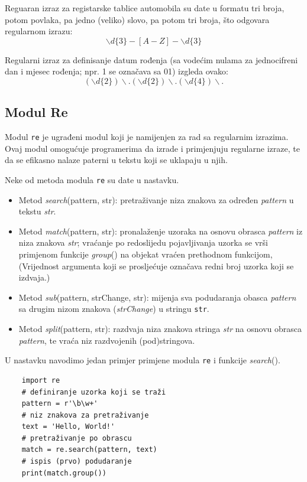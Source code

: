 Reguaran izraz za registarske tablice automobila su date u formatu tri broja, potom povlaka, pa jedno (veliko) slovo, pa potom tri broja, što odgovara regularnom izrazu:
$$ \backslash d \{3\}-[A-Z]-\backslash d\{3\}$$

Regularni izraz za definisanje datum rođenja (sa vodećim nulama za jednocifreni dan i mjesec rođenja; npr. 1 se označava sa 01) izgleda ovako:
$$(\backslash d \{2\})\backslash.(\backslash d \{2\})\backslash.(\backslash d \{4\})\backslash. $$ 

\subsection{Modul Re}
Modul \texttt{re}  je ugrađeni modul koji je namijenjen za rad sa regularnim izrazima. Ovaj modul omogućuje programerima da izrade i primjenjuju regularne izraze, te da se efikasno nalaze paterni u tekstu koji se uklapaju u njih. 

Neke od metoda modula \texttt{re} su date u nastavku.
\begin{itemize}
	\item Metod \textit{search}(pattern, str): pretraživanje niza znakova za određen \textit{pattern} u tekstu \textit{str}.
	\item Metod \textit{match}(pattern, str): pronalaženje  uzoraka na osnovu obrasca \textit{pattern} iz niza znakova \emph{str}; vraćanje po redoslijedu pojavljivanja   uzorka se vrši primjenom funkcije \emph{group}() na objekat vraćen prethodnom funkcijom, (Vrijednost argumenta koji se prosljećuje označava redni broj uzorka koji se izdvaja.)
	
	\item Metod \textit{sub}(pattern, strChange, str): mijenja sva podudaranja obasca \textit{pattern} sa drugim nizom znakova (\textit{strChange}) u stringu \texttt{str}.
	\item Metod \textit{split}(pattern, str): razdvaja  niza znakova stringa \emph{str} na osnovu  obrasca \emph{pattern}, te vraća niz razdvojenih (pod)stringova.
\end{itemize}
 
 U nastavku navodimo jedan primjer primjene modula \texttt{re} i funkcije \textit{search}().
 
 \begin{verbatim}
 	import re
 	# definiranje uzorka koji se traži
 	pattern = r'\b\w+'
 	# niz znakova za pretraživanje
 	text = 'Hello, World!'
 	# pretraživanje po obrascu
 	match = re.search(pattern, text)
 	# ispis (prvo) podudaranje
 	print(match.group()) 
\end{verbatim}

